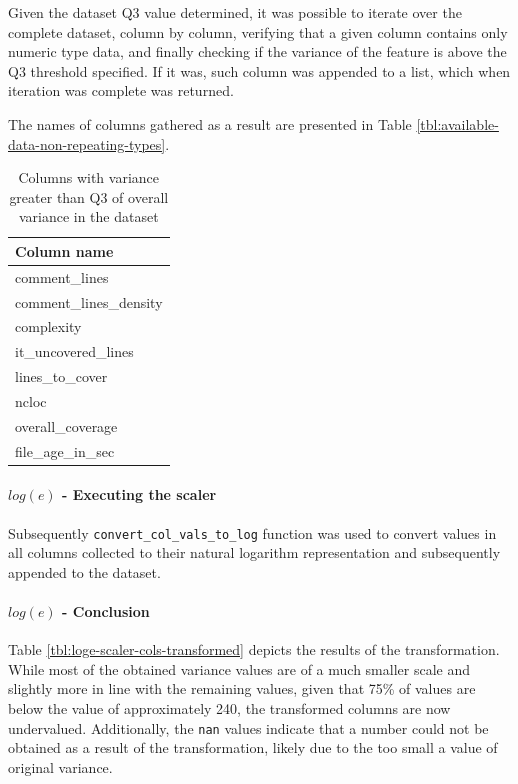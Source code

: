 Given the dataset Q3 value determined, it was possible to iterate over the complete dataset, column by column, verifying that a given column contains only numeric type data, and finally checking if the variance of the feature is above the Q3 threshold specified. If it was, such column was appended to a list, which when iteration was complete was returned. 

The names of columns gathered as a result are presented in Table \ref{tbl:available-data-non-repeating-types}.

\begin{table}[!h]
\centering
\caption{Columns with variance greater than Q3 of overall variance in the dataset}
\label{tab:loge-scaler-cols-aboveq3}
\begin{tabular}{@{}l@{}}
\toprule
Column name \\ \midrule
comment\_lines \\
comment\_lines\_density \\
complexity \\
it\_uncovered\_lines \\
lines\_to\_cover \\
ncloc \\
overall\_coverage \\
file\_age\_in\_sec \\ \bottomrule
\end{tabular}
\end{table}

\paragraph{$log(e)$ - Executing the scaler}
Subsequently \texttt{convert\_col\_vals\_to\_log} function was used to convert values in all columns collected to their natural logarithm representation and subsequently appended to the dataset.

\paragraph{$log(e)$ - Conclusion}
Table \ref{tbl:loge-scaler-cols-transformed} depicts the results of the transformation. While most of the obtained variance values are of a much smaller scale and slightly more in line with the remaining values, given that 75\% of values are below the value of approximately 240, the transformed columns are now undervalued. 
Additionally, the \texttt{nan} values indicate that a number could not be obtained as a result of the transformation, likely due to the too small a value of original variance. 

